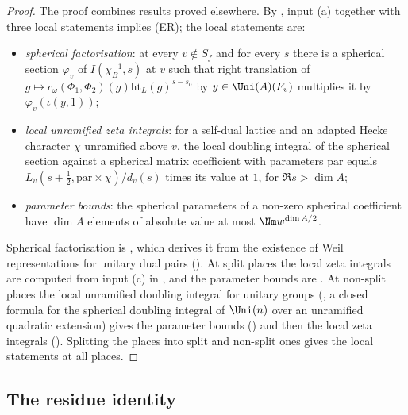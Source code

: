 \begin{proof}
The proof combines results proved elsewhere. By , input (a) together with three local
statements implies (ER); the local statements are:
\begin{itemize}
\item \emph{spherical factorisation}: at every $v\notin S_f$ and for every $s$ there is a spherical section $\varphi_v$ of $I(\chi_B^{-1},s)$ at $v$
such that right translation of $g\mapsto c_\omega(\Phi_1,\Phi_2)(g)\mathrm{ht}_L(g)^{s-s_0}$ by $y\in\Uni(A)(F_v)$ multiplies it by
$\varphi_v(\iota(y,1))$;
\item \emph{local unramified zeta integrals}: for a self-dual lattice and an adapted Hecke character $\chi$ unramified above $v$, the local doubling
integral of the spherical section against a spherical matrix coefficient with parameters $\mathrm{par}$ equals
$L_v(s+\frac12,\mathrm{par}\times\chi)/d_v(s)$ times its value at $1$, for $\Re s>\dim A$;
\item \emph{parameter bounds}: the spherical parameters of a non-zero spherical coefficient have $\dim A$ elements of absolute value at most
$\Nm w^{\dim A/2}$.
\end{itemize}
Spherical factorisation is , which derives it from the existence of
Weil representations for unitary dual pairs (). At split places the local zeta integrals are
computed from input (c) in , and the parameter bounds are
. At non-split places the local unramified doubling integral for unitary groups
(, a closed formula for the spherical doubling integral of $\Uni(n)$ over an unramified
quadratic extension) gives the parameter bounds () and then the local zeta
integrals (). Splitting the places into split and non-split ones gives the local
statements at all places.
\end{proof}

\subsection{The residue identity}\label{sec:pf:liftinj:rsw}

